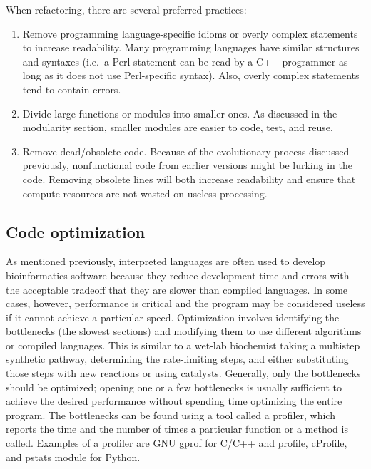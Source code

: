 \documentclass[ChapterTOCs,krantz2]{krantz} %
\begin{document}
When refactoring, there are several preferred practices:  
\begin{enumerate}

\item Remove programming
language-specific idioms or overly complex statements to increase readability.
Many programming languages have similar structures and syntaxes (i.e.\ a Perl
statement can be read by a C++ programmer as long as it does not
use Perl-specific syntax).  Also, overly complex statements 
tend to contain errors.  

\item Divide large
functions or modules into smaller ones.  As discussed in the
modularity section, smaller modules are easier to code, test, and reuse.  

\item Remove dead/obsolete code.  Because of the evolutionary process 
discussed previously,
nonfunctional code from earlier versions might be lurking in the code.
Removing obsolete lines will both increase readability and ensure that compute
resources are not wasted on useless processing.
\end{enumerate}

\subsection{Code optimization}

As mentioned previously, interpreted
languages are often used to develop bioinformatics software because they
reduce development time and errors with the acceptable tradeoff that they are
slower than compiled languages. In some cases, however, performance is critical
and the program may be considered useless if it cannot achieve a particular
speed.  
Optimization involves identifying the bottlenecks (the slowest
sections) and modifying them to use different algorithms or
compiled languages.  This is similar to a wet-lab biochemist taking a multistep
synthetic pathway, determining the rate-limiting steps, and either
substituting those steps with new reactions or using catalysts.  Generally, 
only the
bottlenecks should be optimized; opening one or a few bottlenecks is usually
sufficient to achieve the desired performance without spending time optimizing
the entire program.  The bottlenecks can be found using a tool called a profiler,
which reports the time and the number of times a particular
function or a method is called.
Examples of a profiler are GNU gprof for C/C++ and profile,
cProfile, and pstats module for Python.
\end{document}
